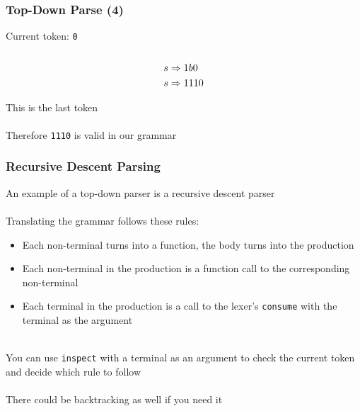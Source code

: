 \documentclass[aspectratio=169]{beamer}
\begin{document}
\begin{frame}
\frametitle{Top-Down Parse (4)}

Current token: \lstinline{0}\\~\\

\begin{align*}
s &\Rightarrow \text{\lstinline{1}} b \text{\lstinline{0}}\\
s &\Rightarrow \text{\lstinline{1}} \text{\lstinline{1}} \text{\lstinline{1}}
               \text{\lstinline{0}}
\end{align*}

This is the last token\\~\\

Therefore \lstinline{1110} is valid in our grammar
\end{frame}

\begin{frame}
\frametitle{Recursive Descent Parsing}

An example of a top-down parser is a \alert{recursive descent parser}\\~\\

Translating the grammar follows these rules:
\begin{itemize}
  \item Each non-terminal turns into a function, the body turns into the
    production
  \item Each non-terminal in the production is a function call to the
    corresponding non-terminal
  \item Each terminal in the production is a call to the lexer's \lstinline{consume} with
    the terminal as the argument\\~\\
\end{itemize}

You can use \lstinline{inspect} with a terminal as an argument to check the
current token and decide which rule to follow\\~\\

There could be backtracking as well if you need it
\end{frame}
\end{document}
